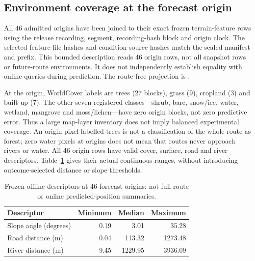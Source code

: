 \documentclass[11pt]{article}
\begin{document}
\subsection{Environment coverage at the forecast origin}
\label{sec:origin-environment}
All 46 admitted origins have been joined to their exact frozen terrain-feature
rows using the release recording, segment, recording-hash block and
origin clock. The selected feature-file hashes and condition-source hashes
match the sealed manifest and prefix. This bounded description reads 46
origin rows, not all snapshot rows or future-route environments. It does not
independently establish equality with online queries during prediction.
The route-free projection is
.

At the origin, WorldCover labels are trees (27 blocks), grass (9), cropland
(3) and built-up (7). The other seven registered classes---shrub, bare,
snow/ice, water, wetland, mangrove and moss/lichen---have zero origin blocks,
not zero predictive error. Thus a large map-layer inventory does not imply
balanced experimental coverage. An origin pixel labelled trees is not a
classification of the whole route as forest; zero water pixels at origins
does not mean that routes never approach rivers or water.
All 46 origin rows have valid cover, surface, road and river descriptors.
Table~\ref{tab:origin-environment-range} gives their actual continuous ranges,
without introducing outcome-selected distance or slope thresholds.

\begin{table}[htbp]
\centering\small
\caption{Frozen offline descriptors at 46 forecast origins; not full-route
or online predicted-position summaries.}
\label{tab:origin-environment-range}
\begin{tabular}{lrrr}
\toprule
Descriptor & Minimum & Median & Maximum\\
\midrule
Slope angle (degrees) & 0.19 & 3.01 & 35.28\\
Road distance (m) & 0.04 & 113.32 & 1273.48\\
River distance (m) & 9.45 & 1229.95 & 3936.09\\
\bottomrule
\end{tabular}
\end{table}
\end{document}
